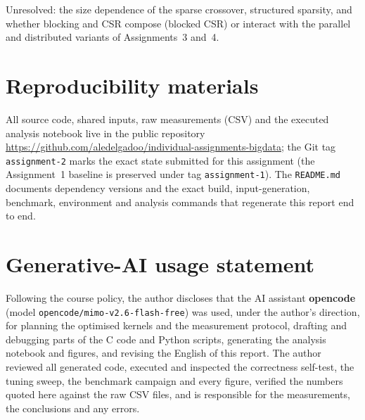 \documentclass[11pt,a4paper]{article}
\begin{document}
Unresolved: the size dependence of the sparse crossover, structured sparsity,
and whether blocking and CSR compose (blocked CSR) or interact with the parallel
and distributed variants of Assignments~3 and~4.

\section{Reproducibility materials}

{\sloppy
All source code, shared inputs, raw measurements (CSV) and the executed analysis
notebook live in the public repository
\url{https://github.com/aledelgadoo/individual-assignments-bigdata};
the Git tag \texttt{assignment-2} marks the exact state submitted for this
assignment (the Assignment~1 baseline is preserved under tag
\texttt{assignment-1}). The \texttt{README.md} documents dependency versions and
the exact build, input-generation, benchmark, environment and analysis commands
that regenerate this report end to end.\par}

\section*{Generative-AI usage statement}

Following the course policy, the author discloses that the AI assistant
\textbf{opencode} (model \texttt{opencode/mimo-v2.6-flash-free}) was used, under
the author's direction, for planning the optimised kernels and the measurement
protocol, drafting and debugging parts of the C code and Python scripts,
generating the analysis notebook and figures, and revising the English of this
report. The author reviewed all generated code, executed and inspected the
correctness self-test, the tuning sweep, the benchmark campaign and every figure,
verified the numbers quoted here against the raw CSV files, and is responsible
for the measurements, the conclusions and any errors.
\end{document}

